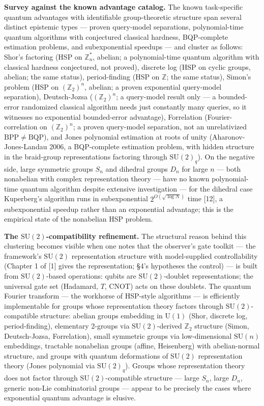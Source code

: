 \documentclass[
]{article}
\begin{document}
\textbf{Survey against the known advantage catalog.} The known
task-specific quantum advantages with identifiable group-theoretic
structure span several distinct epistemic types --- proven query-model
separations, polynomial-time quantum algorithms with conjectured
classical hardness, BQP-complete estimation problems, and subexponential
speedups --- and cluster as follows: Shor's factoring (HSP on
\(\mathbb{Z}_n^*\), abelian; a polynomial-time quantum algorithm with
classical hardness conjectured, not proved), discrete log (HSP on cyclic
groups, abelian; the same status), period-finding (HSP on
\(\mathbb{Z}\); the same status), Simon's problem (HSP on
\((\mathbb{Z}_2)^n\), abelian; a proven exponential query-model
separation), Deutsch-Jozsa (\((\mathbb{Z}_2)^n\); a query-model result
only --- a bounded-error randomized classical algorithm needs just
constantly many queries, so it witnesses no exponential bounded-error
advantage), Forrelation (Fourier-correlation on \((\mathbb{Z}_2)^n\); a
proven query-model separation, not an unrelativized
\(\mathrm{BPP} \neq \mathrm{BQP}\)), and Jones polynomial estimation at
roots of unity (Aharonov-Jones-Landau 2006, a BQP-complete estimation
problem, with hidden structure in the braid-group representations
factoring through \(\mathrm{SU}(2)_q\)). On the negative side, large
symmetric groups \(S_n\) and dihedral groups \(D_n\) for large \(n\) ---
both nonabelian with complex representation theory --- have no known
polynomial-time quantum algorithm despite extensive investigation ---
for the dihedral case Kuperberg's algorithm runs in subexponential
\(2^{O(\sqrt{\log N})}\) time {[}12{]}, a subexponential speedup rather
than an exponential advantage; this is the empirical state of the
nonabelian HSP problem.

\textbf{The \(\mathrm{SU}(2)\)-compatibility refinement.} The structural
reason behind this clustering becomes visible when one notes that the
observer's gate toolkit --- the framework's \(\mathrm{SU}(2)\)
representation structure with model-supplied controllability (Chapter 1
of {[}1{]} gives the representation; §4's hypotheses the control) --- is
built from \(\mathrm{SU}(2)\)-based operations: qubits are
\(\mathrm{SU}(2)\)-doublet representations; the universal gate set
(Hadamard, \(T\), CNOT) acts on these doublets. The quantum Fourier
transform --- the workhorse of HSP-style algorithms --- is efficiently
implementable for groups whose representation theory factors through
\(\mathrm{SU}(2)\)-compatible structure: abelian groups embedding in
\(\mathrm{U}(1)\) (Shor, discrete log, period-finding), elementary
2-groups via \(\mathrm{SU}(2)\)-derived \(\mathbb{Z}_2\) structure
(Simon, Deutsch-Jozsa, Forrelation), small symmetric groups via
low-dimensional \(\mathrm{SU}(n)\) embeddings, tractable nonabelian
groups (affine, Heisenberg) with abelian-normal structure, and groups
with quantum deformations of \(\mathrm{SU}(2)\) representation theory
(Jones polynomial via \(\mathrm{SU}(2)_q\)). Groups whose representation
theory does not factor through \(\mathrm{SU}(2)\)-compatible structure
--- large \(S_n\), large \(D_n\), generic non-Lie combinatorial groups
--- appear to be precisely the cases where exponential quantum advantage
is elusive.
\end{document}
